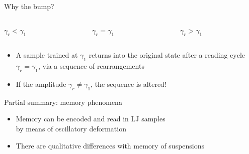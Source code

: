 \documentclass[compress]{beamer}
\begin{document}
	\begin{frame}{Why the bump?}
		
		\begin{columns}[t]

			\begin{column}{0.3\textwidth}
				\begin{block}{\centering $\gamma_{r} < \gamma_{1}$}
					\begin{figure}
					\end{figure}
				\end{block}
			\end{column}

			\begin{column}{0.3\textwidth}
				\begin{block}{\centering $\gamma_{r} = \gamma_{1}$}
					\begin{figure}
					\end{figure}
				\end{block}
			\end{column}

			\begin{column}{0.3\textwidth}
				\begin{block}{\centering $\gamma_{r} > \gamma_{1}$}
					\begin{figure}
					\end{figure}
				\end{block}
			\end{column}
			
		\end{columns}

		\begin{itemize}
			\item<1-> A sample trained at $\gamma_{1}$ returns into the original state after a reading cycle $\gamma_{r} = \gamma_{1}$, via a sequence of rearrangements
			\item<2-> If the amplitude $\gamma_{r} \neq \gamma_{1}$, the sequence is altered!
		\end{itemize}
		
	\end{frame}

	\begin{frame}{Partial summary: memory phenomena}
		
		\begin{itemize}
			\item Memory can be encoded and read in LJ samples \\ by means of oscillatory deformation
			\item There are qualitative differences with memory of suspensions
		\end{itemize}
		
	\end{frame}
\end{document}
